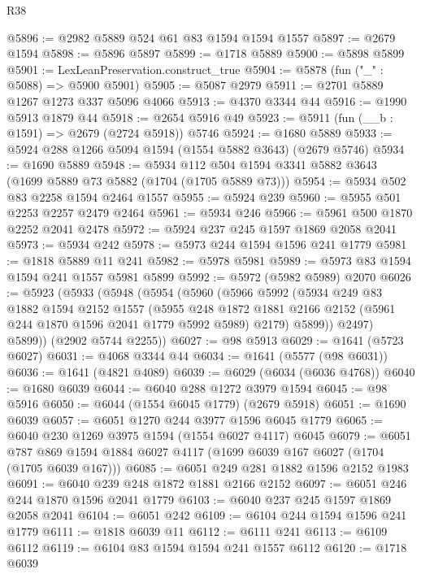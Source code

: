 \begin{lexlean}{R38}
\begin{coremodule}
@5896 := @2982 @5889 @524 @61 @83 @1594 @1594 @1557
@5897 := @2679 @1594
@5898 := @5896 @5897
@5899 := @1718 @5889
@5900 := @5898 @5899
@5901 := LexLeanPreservation.construct_true
@5904 := @5878 (fun ("_" : @5088) => @5900 @5901)
@5905 := @5087 @2979
@5911 := @2701 @5889 @1267 @1273 @337 @5096 @4066
@5913 := @4370 @3344 @44
@5916 := @1990 @5913 @1879 @44
@5918 := @2654 @5916 @49
@5923 := @5911 (fun (__b : @1591) => @2679 (@2724 @5918)) @5746
@5924 := @1680 @5889
@5933 := @5924 @288 @1266 @5094 @1594 (@1554 @5882 @3643) (@2679 @5746)
@5934 := @1690 @5889
@5948 := @5934 @112 @504 @1594 @3341 @5882 @3643 (@1699 @5889 @73 @5882 (@1704 (@1705 @5889 @73)))
@5954 := @5934 @502 @83 @2258 @1594 @2464 @1557
@5955 := @5924 @239
@5960 := @5955 @501 @2253 @2257 @2479 @2464
@5961 := @5934 @246
@5966 := @5961 @500 @1870 @2252 @2041 @2478
@5972 := @5924 @237 @245 @1597 @1869 @2058 @2041
@5973 := @5934 @242
@5978 := @5973 @244 @1594 @1596 @241 @1779
@5981 := @1818 @5889 @11 @241
@5982 := @5978 @5981
@5989 := @5973 @83 @1594 @1594 @241 @1557 @5981 @5899
@5992 := @5972 (@5982 @5989) @2070
@6026 := @5923
    (@5933
      (@5948
        (@5954
          (@5960
            (@5966
              @5992
              (@5934
                @249
                @83
                @1882
                @1594
                @2152
                @1557
                (@5955
                  @248
                  @1872
                  @1881
                  @2166
                  @2152
                  (@5961 @244 @1870 @1596 @2041 @1779 @5992 @5989)
                  @2179)
                @5899))
            @2497)
          @5899))
      (@2902 @5744 @2255))
@6027 := @98 @5913
@6029 := @1641 (@5723 @6027)
@6031 := @4068 @3344 @44
@6034 := @1641 (@5577 (@98 @6031))
@6036 := @1641 (@4821 @4089)
@6039 := @6029 (@6034 (@6036 @4768))
@6040 := @1680 @6039
@6044 := @6040 @288 @1272 @3979 @1594
@6045 := @98 @5916
@6050 := @6044 (@1554 @6045 @1779) (@2679 @5918)
@6051 := @1690 @6039
@6057 := @6051 @1270 @244 @3977 @1596 @6045 @1779
@6065 := @6040 @230 @1269 @3975 @1594 (@1554 @6027 @4117) @6045
@6079 := @6051 @787 @869 @1594 @1884 @6027 @4117 (@1699 @6039 @167 @6027 (@1704 (@1705 @6039 @167)))
@6085 := @6051 @249 @281 @1882 @1596 @2152 @1983
@6091 := @6040 @239 @248 @1872 @1881 @2166 @2152
@6097 := @6051 @246 @244 @1870 @1596 @2041 @1779
@6103 := @6040 @237 @245 @1597 @1869 @2058 @2041
@6104 := @6051 @242
@6109 := @6104 @244 @1594 @1596 @241 @1779
@6111 := @1818 @6039 @11
@6112 := @6111 @241
@6113 := @6109 @6112
@6119 := @6104 @83 @1594 @1594 @241 @1557 @6112
@6120 := @1718 @6039

\end{coremodule}
\end{lexlean}
